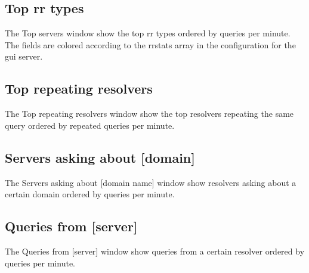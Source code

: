 \documentclass[a4paper]{article}
\begin{document}
\subsection{Top rr types}
The Top servers window show the top rr types ordered by queries per minute. 
The fields are colored according to the rrstats array in the configuration 
for the gui server. 
\subsection{Top repeating resolvers}
The Top repeating resolvers window show the top resolvers repeating the same 
query ordered by repeated queries per minute. 
\subsection{Servers asking about [domain]}
The Servers asking about [domain name] window show resolvers asking about a 
certain domain ordered by queries per minute. 
\subsection{Queries from [server]}
The Queries from [server] window show queries from a certain resolver ordered 
by queries per minute. 
\end{document}
